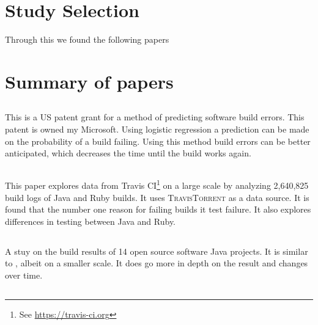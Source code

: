 \documentclass[]{book}
\let\rmarkdownfootnote\footnote%
\def\footnote{\protect\rmarkdownfootnote}
\begin{document}
\section{Study Selection}\label{study-selection}

Through this we found the following papers

\section{Summary of papers}\label{summary-of-papers}

\subsection{\texorpdfstring{\citet{bird2017predicting}}{@bird2017predicting}}\label{bird2017predicting}

This is a US patent grant for a method of predicting software build
errors. This patent is owned my Microsoft. Using logistic regression a
prediction can be made on the probability of a build failing. Using this
method build errors can be better anticipated, which decreases the time
until the build works again.

\subsection{\texorpdfstring{\citet{beller2017oops}}{@beller2017oops}}\label{beller2017oops}

This paper explores data from Travis CI\footnote{See
  \url{https://travis-ci.org}} on a large scale by analyzing 2,640,825
build logs of Java and Ruby builds. It uses \textsc{TravisTorrent} as a
data source. It is found that the number one reason for failing builds
it test failure. It also explores differences in testing between Java
and Ruby.

\subsection{\texorpdfstring{\citet{rausch2017empirical}}{@rausch2017empirical}}\label{rausch2017empirical}

A stuy on the build results of 14 open source software Java projects. It
is similar to \citet{beller2017oops}, albeit on a smaller scale. It does
go more in depth on the result and changes over time.

\subsection{\texorpdfstring{\citet{beller2017travistorrent}}{@beller2017travistorrent}}\label{beller2017travistorrent}
\end{document}
